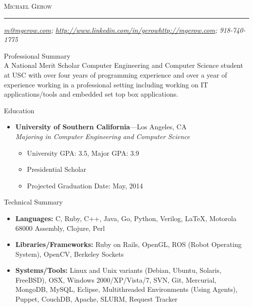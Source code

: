 \documentclass[8pt,oneside]{article}
\makeatletter
\newcommand{\name}{Michael Gerow}
\newcommand{\phone}{918-740-1775}
\newcommand{\email}{\href{mailto:m@mgerow.com?subject=Hello}{m@mgerow.com}}
\newcommand{\linkedin}{\href{http://www.linkedin.com/in/gerow}{http://www.linkedin.com/in/gerow}}
\newcommand{\website}{\href{http://mgerow.com}{http://mgerow.com}}
\newcommand{\bigname}[1]{
	\begin{center}\fontfamily{phv}\selectfont\Large\scshape#1\end{center}
}
\newenvironment{ressection}[1]{
	\vspace{4pt}
	{\fontfamily{phv}\selectfont\large#1}
	\begin{itemize}
	\vspace{3pt}
}{
	\end{itemize}
}
\newcommand{\resplainsection}[1]{
	{\fontfamily{phv}\selectfont\large#1}
	\vspace{-12pt}
	\\

}
\newcommand{\resitem}[1]{
	\vspace{-4pt}
	\item \begin{flushleft} #1 \end{flushleft}
}
\newcommand{\ressubitem}[1]{
	\vspace{-1pt}
	\item \begin{flushleft} #1 \end{flushleft}
}
\newcommand{\resbigitem}[3]{
	\vspace{-5pt}
	\item
	\textbf{#1}---#2 \\
	\textit{#3}
}
\newenvironment{ressubsec}[3]{
	\resbigitem{#1}{#2}{#3}
	\vspace{-2pt}
	\begin{itemize}
}{
	\end{itemize}
}
\makeatother
\begin{document}
 \selectfont

\bigname{\name}

\vspace{-8pt} \rule{\textwidth}{1pt}

\vspace{-1pt} {\small\itshape \email; \linkedin \hfill \website; \phone}

\vspace{8 pt}


\resplainsection{Professional Summary}
	A National Merit Scholar Computer Engineering and Computer Science student at USC with over four years of programming experience and over a year of experience working in a professional setting including working on IT applications/tools and embedded set top box applications.

\begin{ressection}{Education}

	\begin{ressubsec}{University of Southern California}{Los Angeles, CA}{Majoring in Computer Engineering and Computer Science}
		\ressubitem{University GPA:  3.5, Major GPA: 3.9}
		\ressubitem{Presidential Scholar}
		\ressubitem{Projected Graduation Date:  May, 2014}
	\end{ressubsec}

\end{ressection}

\begin{ressection}{Technical Summary}

	\resitem{\textbf{Languages:} C, Ruby, C++, Java, Go, Python, Verilog, \LaTeX, Motorola 68000 Assembly, Clojure, Perl}
	\resitem{\textbf{Libraries/Frameworks:} Ruby on Rails, OpenGL, ROS (Robot Operating System), OpenCV, Berkeley Sockets }
	\resitem{\textbf{Systems/Tools:} Linux and Unix variants (Debian, Ubuntu, Solaris, FreeBSD), OSX, Windows 2000/XP/Vista/7, SVN, Git, Mercurial, MongoDB, MySQL, Eclipse, Multithreaded Environments (Using Agents), Puppet, CouchDB, Apache, SLURM, Request Tracker}
	
\end{ressection}


\end{document}
